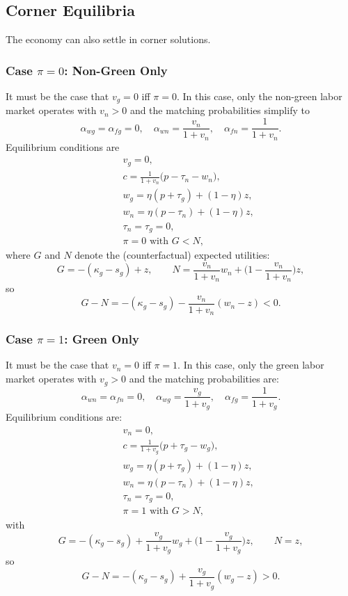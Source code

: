 \documentclass[preprint,12pt]{elsarticle}
\begin{document}
\subsection{Corner Equilibria}

The economy can also settle in corner solutions.

\subsubsection{Case \(\pi=0\): Non-Green Only}

It must be the case that \(v_g=0\) iff \(\pi=0\). In this case, only the non-green labor market operates with \(v_n>0\) and the matching probabilities simplify to
\[
\alpha_{wg}=\alpha_{fg}=0, \quad 
\alpha_{wn}=\frac{v_n}{1+v_n}, \quad 
\alpha_{fn}=\frac{1}{1+v_n}.
\]
Equilibrium conditions are
\begin{eqnarray*}
&& v_g=0, \\
&& c=\frac{1}{1+v_n}\big(p - \tau_n - w_n\big), \\
&& w_g = \eta(p+\tau_g)+(1-\eta)z, \\
&& w_n = \eta(p-\tau_n)+(1-\eta)z, \\
&& \tau_n=\tau_g=0, \\
&& \pi=0 \text{ with } G<N,
\end{eqnarray*}
where \(G\) and \(N\) denote the (counterfactual) expected utilities:
\[
G=-(\kappa_g - s_g)+z,\qquad 
N=\frac{v_n}{1+v_n}w_n+\Big(1-\frac{v_n}{1+v_n}\Big)z,
\]
so
\[
G-N=-(\kappa_g-s_g)-\frac{v_n}{1+v_n}(w_n-z)<0.
\]

\subsubsection{Case \(\pi=1\): Green Only}

It must be the case that \(v_n=0\) iff \(\pi=1\). In this case, only the green labor market operates with \(v_g>0\) and the matching probabilities are:
\[
\alpha_{wn}=\alpha_{fn}=0, \quad
\alpha_{wg}=\frac{v_g}{1+v_g}, \quad
\alpha_{fg}=\frac{1}{1+v_g}.
\]
Equilibrium conditions are:
\begin{eqnarray*}
&& v_n=0, \\
&& c=\frac{1}{1+v_g}\big(p + \tau_g - w_g\big), \\
&& w_g = \eta(p+\tau_g)+(1-\eta)z, \\
&& w_n = \eta(p-\tau_n)+(1-\eta)z, \\
&& \tau_n=\tau_g=0, \\
&& \pi=1 \text{ with } G>N,
\end{eqnarray*}
with
\[
G=-(\kappa_g - s_g)+\frac{v_g}{1+v_g}w_g+\Big(1-\frac{v_g}{1+v_g}\Big)z,\qquad
N=z,
\]
so
\[
G-N=-(\kappa_g-s_g)+\frac{v_g}{1+v_g}(w_g-z)>0.
\]
\end{document}
